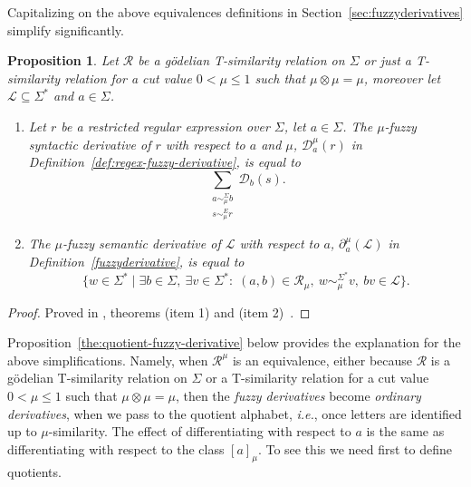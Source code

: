 \documentclass{article}
\newcommand{\cR}{{\mathcal R}}
\def\cut{\mu}
\newtheorem{proposition}{Proposition}[section]
\begin{document}
Capitalizing on the above equivalences definitions in Section~\ref{sec:fuzzyderivatives} simplify significantly. 

\begin{proposition}\label{fuzzyderivativeGodel}
Let $\cR$ be a g\"odelian T-similarity relation on $\Sigma$ or just a T-similarity relation for a cut value $0 < \cut \le 1$ such that $\mu\otimes\mu=\mu$, moreover let $\mathcal{L}\subseteq\Sigma^*$ and $a\in\Sigma$. 
\begin{enumerate}
\item \label{def:regex-fuzzy-derivative-godel}
Let $r$ be a restricted regular expression over $\Sigma$, let $a\in\Sigma$. The $\mu$-fuzzy syntactic derivative  of $r$ with respect to $a$ and
$\cut$, $\mathcal D_a^\cut(r)$ in Definition~\ref{def:regex-fuzzy-derivative}, is equal to
\[  \sum\limits_{\substack{a\sim_\cut^\Sigma b\\ s\sim_\cut^E r}}
  \mathcal D_b(s).
\]
\item The $\cut$-fuzzy semantic
derivative of $\mathcal{L}$ with respect to $a$, $\partial_a^\cut(\mathcal{L})$ in Definition~\ref{fuzzyderivative}, is equal to
$$
\{w \in \Sigma^* \mid
  \exists b \in \Sigma,\ \exists v\in\Sigma^*
  :\;
  (a,b)\in\cR_\cut,\ w\sim_\cut^{\Sigma^*}v,\ bv\in\mathcal{L}
\}.
$$
\end{enumerate}
\end{proposition}
\begin{proof}
\begin{sloppypar}\raggedright
Proved in , theorems
 (item 1) and  (item 2)~\cite{OurRocqRepo}.
\end{sloppypar}
\end{proof}
\bigskip

Proposition~\ref{the:quotient-fuzzy-derivative} below provides the explanation for  the above simplifications. Namely, when $\cR^\mu$ is an equivalence,  either because $\cR$ is a g\"odelian T-similarity relation on $\Sigma$ or  a T-similarity relation for a cut value $0<\cut \le 1$ such that $\mu\otimes\mu=\mu$,  then the {\em fuzzy derivatives} become {\em ordinary derivatives}, when we pass to the quotient alphabet, {\em i.e.}, once letters are identified up to
$\cut$-similarity. The effect of differentiating with respect to $a$ is the same as
differentiating with respect to the class $[a]_\cut$. 
To see this we need first to define quotients.
\end{document}
